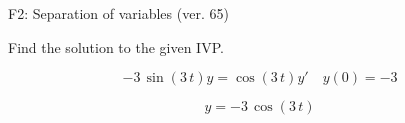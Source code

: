 \begin{exercise}
  \begin{exerciseTitle}F2: Separation of variables (ver. 65)\end{exerciseTitle}
  \begin{exerciseStatement}
    
Find the solution to the given IVP.

    
\[-3 \, \sin\left(3 \, t\right) y= \cos\left(3 \, t\right) y'\hspace{1em} y\left( 0 \right)= -3\]

  \end{exerciseStatement}
  \begin{exerciseAnswer}
    
\[y= -3 \, \cos\left(3 \, t\right)\]

  \end{exerciseAnswer}
\end{exercise}